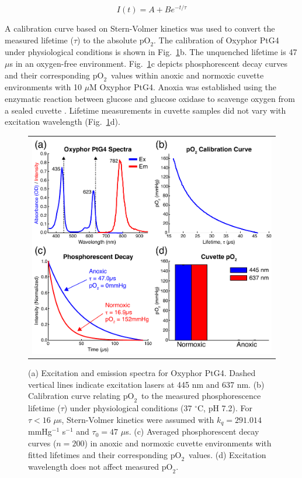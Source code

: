 \documentclass[12pt]{spieman}  %
\newcommand{\pO}{\ensuremath{\text{pO}_2}}
\begin{document}
\begin{spacing}{2}
\begin{equation}
    \label{eq:phosphorescence}
    I(t) = A + Be^{-t / \tau}
\end{equation}

A calibration curve based on Stern-Volmer kinetics \cite{Vanderkooi:1986hs,Wilson:2003ek} was used to convert the measured lifetime ($\tau$) to the absolute \pO. The calibration of Oxyphor PtG4 under physiological conditions is shown in Fig.~\ref{fig:oxyphor_ptg4}b. The unquenched lifetime is 47 $\mu$s in an oxygen-free environment. Fig.~\ref{fig:oxyphor_ptg4}c depicts phosphorescent decay curves and their corresponding \pO\ values within anoxic and normoxic cuvette environments with 10 $\mu$M Oxyphor PtG4. Anoxia was established using the enzymatic reaction between glucose and glucose oxidase to scavenge oxygen from a sealed cuvette \cite{Lo:1997he}. Lifetime measurements in cuvette samples did not vary with excitation wavelength (Fig.~\ref{fig:oxyphor_ptg4}d).

\begin{figure}
    \begin{center}
        \begin{tabular}{c}
            \includegraphics[width=6.25in]{Figure2.pdf}
        \end{tabular}
    \end{center}
    \caption {
        \label{fig:oxyphor_ptg4}
        (a) Excitation and emission spectra for Oxyphor PtG4. Dashed vertical lines indicate excitation lasers at 445 nm and 637 nm. (b) Calibration curve relating \pO\ to the measured phosphorescence lifetime ($\tau$) under physiological conditions (37 $^\circ$C, pH 7.2). For $\tau < 16$ $\mu$s, Stern-Volmer kinetics were assumed with $k_q = 291.014$ mmHg$^{-1}$ s$^{-1}$ and $\tau_0 = 47$ $\mu$s. (c) Averaged phosphorescent decay curves ($n = 200$) in anoxic and normoxic cuvette environments with fitted lifetimes and their corresponding \pO\ values. (d) Excitation wavelength does not affect measured \pO.
    }
\end{figure}


\end{spacing}
\end{document}
